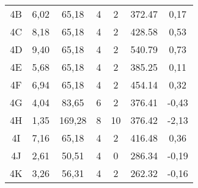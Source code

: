 \begin{table}[h]
\begin{tabular}{c|ccccc|c}
4B               & 6,02             & 65,18         & 4            & 2              & 372.47      & 0,17           \\
4C               & 8,18             & 65,18         & 4            & 2              & 428.58      & 0,53           \\
4D               & 9,40             & 65,18         & 4            & 2              & 540.79      & 0,73           \\
4E               & 5,68             & 65,18         & 4            & 2              & 385.25      & 0,11           \\
4F               & 6,94             & 65,18         & 4            & 2              & 454.14      & 0,32           \\
4G               & 4,04             & 83,65         & 6            & 2              & 376.41      & -0,43          \\
4H               & 1,35             & 169,28        & 8            & 10             & 376.42      & -2,13          \\
4I               & 7,16             & 65,18         & 4            & 2              & 416.48      & 0,36           \\
4J               & 2,61             & 50,51         & 4            & 0              & 286.34      & -0,19          \\
4K               & 3,26             & 56,31         & 4            & 2              & 262.32      & -0,16          \\ \hline
\end{tabular}
\end{table}

\clearpage

